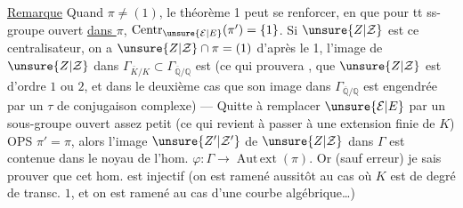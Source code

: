 \uline{Remarque} Quand $\pi\neq(1)$,  le théorème 1 peut se renforcer,  en  que pour tt ss-groupe  ouvert \uline{dans $\pi$}, $\operatorname{Centr}_{\unsure{\mathcal E|E}}(\pi')=\{1\}$. Si $\unsure{Z|\mathcal Z}$ est ce centralisateur, on a $\unsure{Z|\mathcal Z}\cap\pi=(1)$ d'après le 1,  l'image de $\unsure{Z|\mathcal Z}$ dans $\Gamma_{\bar K/K}\subset\Gamma_{\overline{\mathbb Q}/\mathbb Q}$ est  (ce qui prouvera  , que $\unsure{Z|\mathcal Z}$ est d'ordre $1$ ou $2$, et dans le deuxième cas que son image dans $\Gamma_{\overline{\mathbb Q}/\mathbb Q}$ est  engendrée par un $\tau$ de conjugaison complexe) --- Quitte à remplacer $\unsure{\mathcal E|E}$ par un sous-groupe ouvert assez petit (ce qui revient à passer à une extension finie de $K$) OPS $\pi'=\pi$, alors l'image $\unsure{Z'|\mathcal Z'}$ de $\unsure{Z|\mathcal Z}$ dans $\Gamma$ est contenue dans le noyau de l'hom. $\varphi:\Gamma\longrightarrow\operatorname{Aut\,ext}(\pi)$. Or (sauf erreur) je sais prouver que cet hom. est injectif (on est ramené aussitôt au cas où $K$ est de degré de transc. $1$, et on est ramené au cas  d'une courbe algébrique\ldots)

